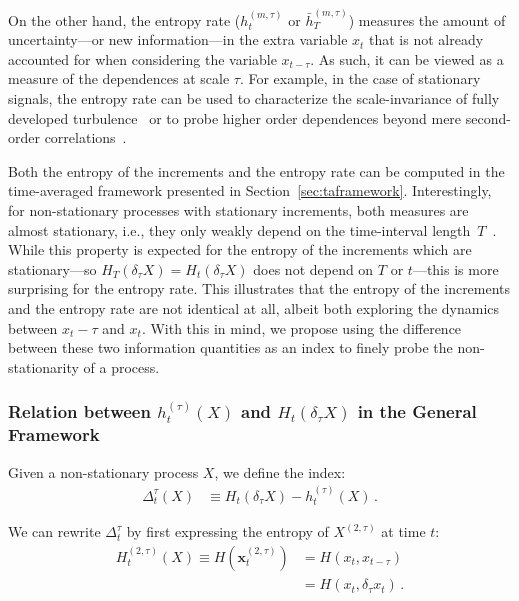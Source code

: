 \documentclass[aps,pra,groupedaddress,notitlepage]{revtex4-1}
\begin{document}
On the other hand, the entropy rate ($h_t^{(m,\tau)}$ or $\bar{h}_T^{(m,\tau)}$) measures the amount of uncertainty---or new information---in the extra variable $x_{t}$ that is not already accounted for when considering the variable $x_{t-\tau}$. As such, it can be viewed as a measure of the dependences at scale $\tau$. For example, in the case of stationary signals, the entropy rate can be used to characterize the scale-invariance of fully developed turbulence~\cite{GBelinchon2016} or to probe higher order dependences beyond mere second-order correlations~\cite{GraneroBelinchon2019a}.

Both the entropy of the increments and the entropy rate can be computed in the time-averaged framework presented in Section~\ref{sec:taframework}.
Interestingly, for non-stationary processes with stationary increments, both measures are almost stationary, {i.e.}, they only weakly depend  on  the time-interval length~$T$~\cite{GraneroBelinchon2019}. While this property is expected for the entropy of the increments which are stationary---so $H_{T}(\delta_\tau X)=H_t(\delta_\tau X)$ does not depend on $T$ or $t$---this is more surprising for the entropy rate.
%
This illustrates that the entropy of the increments and the entropy rate are not identical at all, albeit both exploring the dynamics between $x_t-\tau$ and $x_t$. With this in mind, we propose using the difference between these two information quantities as an index to finely probe the non-stationarity of a process.


\subsubsection{Relation between $h_t^{(\tau)}(X)$ and $H_t(\delta_{\tau}X)$ in the General Framework}

Given a non-stationary process $X$, we define the index:
\begin{align}
\Delta_t^{\tau}(X) &\equiv H_t(\delta_\tau X) - h_t^{(\tau)}(X) \,. \label{eq:Delta:abstract}
\end{align}

We can rewrite $\Delta_t^{\tau}$ by first expressing the entropy of $X^{(2,\tau)}$ at time $t$:
%
\begin{align}
H^{(2,\tau)}_t(X) \equiv H(\textbf{x}_t^{(2,\tau)}) &=H\left( x_t, x_{t-\tau}\right) \nonumber \\
&= H \left(x_t, \delta_\tau x_t \right) \,. \label{eq:H2:inc}
\end{align}
%
\end{document}
